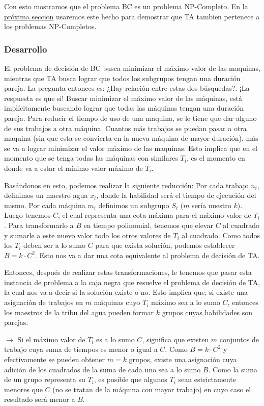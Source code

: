 \documentclass{article}
\begin{document}
Con esto mostramos que el problema BC es un problema NP-Completo. En la \hyperref[sec:np-completo-bc-desarrollo]{próxima seccion} usaremos este hecho para demostrar que TA tambien pertenece a los problemas NP-Completos.


\subsubsection{Desarrollo}
\label{sec:np-completo-bc-desarrollo}
El problema de decisión de BC busca minimizar el máximo valor de las maquinas, mientras que TA busca lograr que todos los subgrupos tengan una duración pareja. La pregunta entonces es: ¿Hay relación entre estas dos búsquedas?. ¡La respuesta es que si! Buscar minimizar el máximo valor de las máquinas, está implícitamente buscando lograr que todas las máquinas tengan una duración pareja.
Para reducir el tiempo de uso de una maquina, se le tiene que dar alguno de sus trabajos a otra máquina. Cuantos más trabajos se puedan pasar a otra maquina (sin que esta se convierta en la nueva máquina de mayor duración), más se va a lograr minimizar el valor máximo de las maquinas.
Esto implica que en el momento que se tenga todas las máquinas con similares $T_i$, es el momento en donde va a estar el mínimo valor máximo de $T_i$. 

Basándonos en esto, podemos realizar la siguiente reducción:
Por cada trabajo $n_i$, definimos un maestro agua $x_i$, donde la habilidad será el tiempo de ejecución del mismo. Por cada máquina $m_i$ definimos un subgrupo $S_i$ ($m$ sería nuestro $k$).
Luego tenemos $C$, el cual representa una cota máxima para el máximo valor de $T_i$. Para transformarlo a $B$ en tiempo polinomial, tenemos que elevar $C$ al cuadrado y sumarle a este nuevo valor todo los otros valores de $T_i$ al cuadrado. Como todos los $T_i$ deben ser a lo sumo $C$ para que exista solución, podemos establecer $B = k \cdot C^2$. Esto nos va a dar una cota equivalente al problema de decisión de TA.

Entonces, después de realizar estas transformaciones, le tenemos que pasar esta instancia de problema a la caja negra que resuelve el problema de decisión de TA, la cual nos va a decir si la solución existe o no. Esto implica que, si existe una asignación de trabajos en $m$ máquinas cuyo $T_i$ máximo sea a lo sumo $C$, entonces los maestros de la tribu del agua pueden formar $k$ grupos cuyas habilidades son parejas.

$\rightarrow$ Si el máximo valor de $T_i$ es a lo sumo $C$, significa que existen $m$ conjuntos de trabajo cuya suma de tiempos es menor o igual a $C$. Como $B = k \cdot C^2$ y efectivamente se pueden obtener $m = k$ grupos, existe una asignación cuya adición de los cuadrados de la suma de cada uno sea a lo sumo $B$. Como la suma de un grupo representa su $T_i$, es posible que algunos $T_i$ sean estrictamente menores que $C$ (no se tratan de la máquina con mayor trabajo) en cuyo caso el resultado será menor a $B$. 
\end{document}
